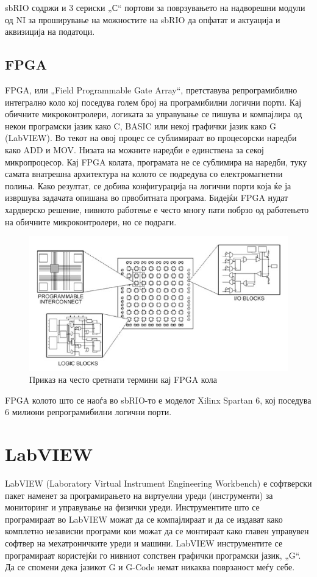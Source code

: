 \documentclass[12pt]{article}
\begin{document}
	sbRIO содржи и 3 сериски „С“ портови за поврзувањето на надворешни модули од NI за проширување на можностите на sbRIO да опфатат и актуација и аквизиција на податоци.

	\subsection{FPGA}
		FPGA, или „Field Programmable Gate Array“, претставува репрограмибилно интегрално коло кој поседува голем број на програмибилни логични порти. Кај обичните микроконтролери, логиката за управување се пишува и компајлира од некои програмски јазик како C, BASIC или некој графички јазик како G (LabVIEW). Во текот на овој процес се сублимираат во процесорски наредби како ADD и MOV. Низата на можните наредби е единствена за секој микропроцесор. Кај FPGA колата, програмата не се сублимира на наредби, туку самата внатрешна архитектура на колото се подредува со електромагнетни полиња. Како резултат, се добива конфигурација на логични порти која ќе ја извршува задачата опишана во првобитната програма. Бидејќи FPGA нудат хардверско решение, нивното работење е често многу пати побрзо од работењето на обичните микроконтролери, но се подраги.

		\begin{figure}[h]
			\includegraphics[width=0.75\linewidth]{./images/fpga_diagram.jpg}
			\centering
			\caption{Приказ на често сретнати термини кај FPGA кола}
			\label{fig:fpga_diagram_jpg}
			\end{figure}

		FPGA колото што се наоѓа во sbRIO-то е моделот Xilinx Spartan 6, кој поседува 6 милиони репрограмибилни логични порти.
\newpage

\section{LabVIEW}
  LabVIEW (Laboratory Virtual Instrument Engineering Workbench) е софтверски пакет наменет за програмирањето на виртуелни уреди (инструменти) за мониторинг и управување на физички уреди. Инструментите што се програмираат во LabVIEW можат да се компајлираат и да се издават како комплетно независни програми кои можат да се монтираат како главен управувен софтвер на мехатроничките уреди и машини. LabVIEW инструментите се програмираат користејќи го нивниот сопствен графички програмски јазик, „G“. Да се спомени дека јазикот G и G-Code немат никаква поврзаност меѓу себе.
\end{document}
